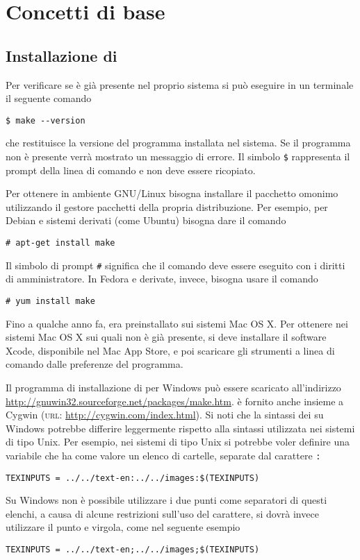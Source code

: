 \cleardoublepage{}
\chapter{Concetti di base}
\label{cha:concetti-base}

\section{Installazione di }
\label{sec:installazione}

Per verificare se  è già presente nel proprio sistema si può
eseguire in un terminale il seguente comando
\begin{verbatim}
$ make --version
\end{verbatim}
che restituisce la versione del programma installata nel sistema.  Se il
programma non è presente verrà mostrato un messaggio di errore.  Il simbolo
\texttt{\$} rappresenta il prompt della linea di comando e non deve essere
ricopiato.

Per ottenere  in ambiente GNU/Linux bisogna installare il
pacchetto omonimo utilizzando il gestore pacchetti della propria distribuzione.
Per esempio, per Debian e sistemi derivati (come Ubuntu) bisogna dare il comando
\begin{verbatim}
# apt-get install make
\end{verbatim}
Il simbolo di prompt \texttt{\#} significa che il comando deve essere eseguito
con i diritti di amministratore.  In Fedora e derivate, invece, bisogna usare
il comando
\begin{verbatim}
# yum install make
\end{verbatim}

Fino a qualche anno fa,  era preinstallato sui sistemi Mac OS X.
Per ottenere  nei sistemi Mac OS X sui quali non è già presente,
si deve installare il software Xcode, disponibile nel Mac App Store, e poi
scaricare gli strumenti a linea di comando dalle preferenze del programma.

Il programma di installazione di  per Windows può essere
scaricato all'indirizzo \url{http://gnuwin32.sourceforge.net/packages/make.htm}.
 è fornito anche insieme a Cygwin (\textsc{url}:
\url{http://cygwin.com/index.html}).  Si noti che la sintassi dei
 su Windows potrebbe differire leggermente rispetto alla
sintassi utilizzata nei sistemi di tipo Unix.  Per esempio, nei sistemi di tipo
Unix si potrebbe voler definire una variabile che ha come valore un elenco di
cartelle, separate dal
carattere \texttt{:}
\begin{verbatim}
TEXINPUTS = ../../text-en:../../images:$(TEXINPUTS)
\end{verbatim}
Su Windows non è possibile utilizzare i due punti come separatori di questi
elenchi, a causa di alcune restrizioni sull'uso del carattere, si dovrà invece
utilizzare il punto e virgola, come nel seguente esempio
\begin{verbatim}
TEXINPUTS = ../../text-en;../../images;$(TEXINPUTS)
\end{verbatim}

